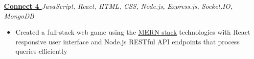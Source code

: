 \textbf{\href{https://github.com/ThangMinhCao/connect_4}{Connect 4 }} \hfill \textit{JavaScript, React, HTML, CSS, Node.js, Express.js, Socket.IO, MongoDB} \par
\begin{itemize}
	\item Created a full-stack web game using the \ul{MERN stack} technologies with React responsive user interface and Node.js RESTful API endpoints that process queries efficiently
\end{itemize}\vspace{0.1cm} \par